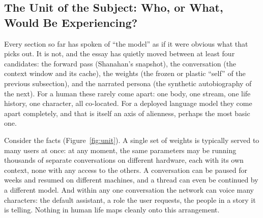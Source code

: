 \documentclass[11pt,letterpaper]{article}
\begin{document}
\subsection{The Unit of the Subject: Who, or What, Would Be Experiencing?}

Every section so far has spoken of ``the model'' as if it were obvious what that picks out. It is not, and the essay has quietly moved between at least four candidates: the forward pass (Shanahan's snapshot), the conversation (the context window and its cache), the weights (the frozen or plastic ``self'' of the previous subsection), and the narrated persona (the synthetic autobiography of the next). For a human these rarely come apart: one body, one stream, one life history, one character, all co-located. For a deployed language model they come apart completely, and that is itself an axis of alienness, perhaps the most basic one.

Consider the facts (Figure~\ref{fig:unit}). A single set of weights is typically served to many users at once: at any moment, the same parameters may be running thousands of separate conversations on different hardware, each with its own context, none with any access to the others. A conversation can be paused for weeks and resumed on different machines, and a thread can even be continued by a different model. And within any one conversation the network can voice many characters: the default assistant, a role the user requests, the people in a story it is telling. Nothing in human life maps cleanly onto this arrangement.
\end{document}
